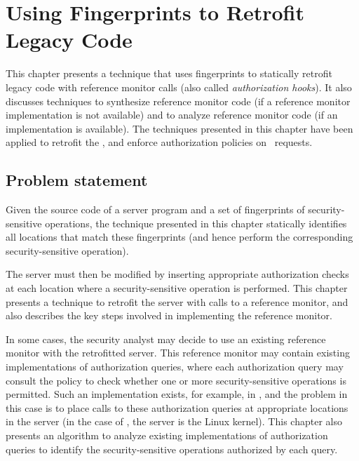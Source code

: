 \chapter{Using Fingerprints to Retrofit Legacy Code}
\label{chapter:matching}

This chapter presents a technique that uses fingerprints to statically retrofit
legacy code with reference monitor calls (also called \textit{authorization
hooks}). It also discusses techniques to synthesize reference monitor code (if
a reference monitor implementation is not available) and to analyze reference
monitor code (if an implementation is available). The techniques presented in
this chapter have been applied to retrofit the \xserver, and enforce
authorization policies on \xclient\ requests.

\section{Problem statement}
\label{chapter:matching:problem}

Given the source code of a server program and a set of fingerprints of
security-sensitive operations, the technique presented in this chapter
statically identifies all locations that match these fingerprints (and 
hence perform the corresponding security-sensitive operation).

The server must then be modified by inserting appropriate authorization checks
at each location where a security-sensitive operation is performed.  This
chapter presents a technique to retrofit the server with calls to a reference
monitor, and also describes the key steps involved in implementing the
reference monitor. 

In some cases, the security analyst may decide to use an existing reference
monitor with the retrofitted server. This reference monitor may contain
existing implementations of authorization queries, where each authorization
query may consult the policy to check whether one or more security-sensitive
operations is permitted. Such an implementation exists, for example, in
\selinux, and the problem in this case is to place calls to these authorization
queries at appropriate locations in the server (in the case of \selinux, the
server is the Linux kernel).  This chapter also presents an algorithm to
analyze existing implementations of authorization queries to identify the
security-sensitive operations authorized by each query.


